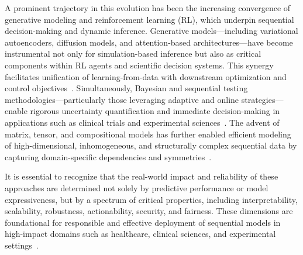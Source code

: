 \documentclass[sigconf]{acmart}
\begin{document}
A prominent trajectory in this evolution has been the increasing convergence of generative modeling and reinforcement learning (RL), which underpin sequential decision-making and dynamic inference. Generative models—including variational autoencoders, diffusion models, and attention-based architectures—have become instrumental not only for simulation-based inference but also as critical components within RL agents and scientific decision systems. This synergy facilitates unification of learning-from-data with downstream optimization and control objectives~\cite{ref62,ref63,ref64,ref66,ref67,ref75,ref79,ref86,ref87}. Simultaneously, Bayesian and sequential testing methodologies—particularly those leveraging adaptive and online strategies—enable rigorous uncertainty quantification and immediate decision-making in applications such as clinical trials and experimental sciences~\cite{ref16,ref51,ref64,ref73,ref75,ref84}. The advent of matrix, tensor, and compositional models has further enabled efficient modeling of high-dimensional, inhomogeneous, and structurally complex sequential data by capturing domain-specific dependencies and symmetries~\cite{ref14,ref37,ref39,ref40,ref62}.

It is essential to recognize that the real-world impact and reliability of these approaches are determined not solely by predictive performance or model expressiveness, but by a spectrum of critical properties, including interpretability, scalability, robustness, actionability, security, and fairness. These dimensions are foundational for responsible and effective deployment of sequential models in high-impact domains such as healthcare, clinical sciences, and experimental settings~\cite{ref2,ref7,ref8,ref19,ref24,ref32,ref33,ref35,ref38,ref51,ref55,ref62,ref63,ref64,ref66,ref73,ref85}.
\end{document}
